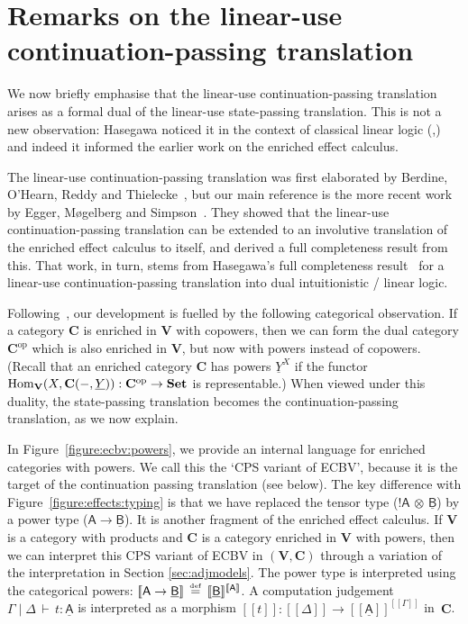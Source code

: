\documentclass{LMCS}
\newcommand{\comptype}[1]{\underline{#1}}
\newcommand{\TVX}{X}
\newcommand{\algY}{{\comptype{Y}}}
\newcommand{\VA}{\mathsf{A}}
\newcommand{\CA}{\comptype{\mathsf{A}}}
\newcommand{\CB}{\comptype{\mathsf{B}}}
\newcommand{\tensor}{\otimes}
\newcommand{\ltensortype}[2]{{!} #1 \, {\tensor} \, #2}
\newcommand{\lpowertype}[2]{#1\to #2}
\newcommand{\rIn}[2]{#1 \colon  #2}
\newcommand{\aj}[4]{#1 \mid  \! #2 \, \vdash \, \rIn{#3}{#4}}
\newcommand{\VCat}{\fixedcatfont{V}} \newcommand{\CCat}{\fixedcatfont{C}} \newcommand{\DCat}{\fixedcatfont{D}}
\newcommand{\fixedcatfont}{\mathbf}
\newcommand{\denlb}{[\![}
\newcommand{\denrb}{]\!]}
\newcommand{\den}[1]{\denlb{#1}\denrb}
\newcommand{\Set}{\mathbf{Set}}
\newcommand{\opcat}[1]{#1^{\mathrm{op}}}
\newcommand{\defeq}{\mathrel{\,\stackrel{\mbox{\tiny{$\mathrm{def}$}}}=\,}}
\begin{document}
\section{Remarks on the linear-use continuation-passing translation}
\label{sec:cps}

We now briefly emphasise that the linear-use continuation-passing
translation arises as a formal
dual of the linear-use state-passing translation.  
This is not a new observation: Hasegawa noticed it 
in the context of classical linear logic 
(\cite[\S 8]{Hasegawa:Flops:02},\cite{pmp-mec})
and indeed it informed the earlier work on the enriched effect calculus.



The linear-use continuation-passing translation 
was first elaborated by Berdine, O'Hearn, Reddy 
and Thielecke~\cite{Berdine:02}, 
but our main reference is 
the more recent work by Egger, M\o gelberg and
Simpson~\cite{Mogelberg:fossacs:10,EEC:LCPS:journal}. They showed that the linear-use
continuation-passing translation can be extended to an involutive
translation of the enriched effect calculus to itself, and derived a
full completeness result from this.  That work, in turn, stems from
Hasegawa's full completeness result~\cite{Hasegawa:Flops:02} for a
linear-use continuation-passing translation into dual intuitionistic /
linear logic.


Following~\cite{Mogelberg:fossacs:10},
our development is fuelled by the following categorical observation.
If a category $\CCat$ is enriched in $\VCat$ with copowers, then we
can form the dual category $\opcat\CCat$ which is also enriched in
$\VCat$, but now with powers instead of copowers.  (Recall that an
enriched category $\CCat$ has powers $\algY^\TVX$ if the functor
$\Homset{\VCat}{\TVX}{\CCat(-,\algY)}:\opcat\CCat\to \Set$ is
representable.)
When viewed under this duality, the state-passing translation
becomes the continuation-passing translation, as we now explain.

In Figure~\ref{figure:ecbv:powers}, we provide
an internal language for enriched categories with powers.
We call this the `CPS variant of ECBV', because
it is the target of the continuation passing translation 
(see below).
The key difference with Figure~\ref{figure:effects:typing} is that we 
have replaced the tensor type ($\ltensortype\VA\CB$) by
a power type ($\lpowertype \VA\CB$).
It is another fragment of the enriched effect calculus.
If $\VCat$ is a category with products
and $\CCat$ is a category enriched in $\VCat$ with powers,
then we can interpret this CPS variant of ECBV in $(\VCat,\CCat)$
through a variation of the interpretation in Section \ref{sec:adjmodels}.
The power type is interpreted using the categorical powers:
${\den {\lpowertype\VA\CB}\defeq
\den \CB^{\den\VA}}$.
A computation judgement $\aj\Gamma\Delta t \CA$ 
is interpreted as a morphism
$\den t:\den\Delta\to\den\CA^{\den\Gamma}$ in~$\CCat$.
\end{document}
